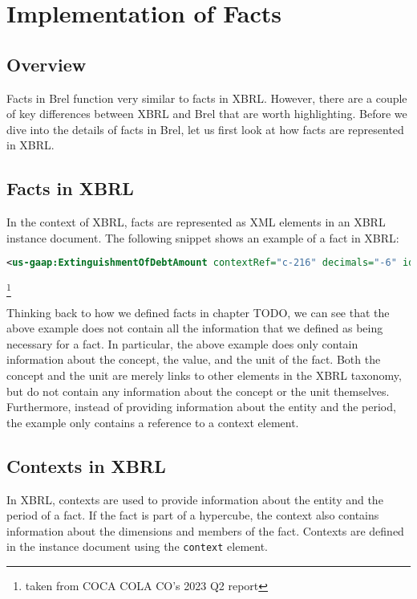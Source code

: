 \section{Implementation of Facts}

\subsection{Overview}

Facts in Brel function very similar to facts in XBRL. 
However, there are a couple of key differences between XBRL and Brel that are worth highlighting.
Before we dive into the details of facts in Brel, let us first look at how facts are represented in XBRL.

\subsection{Facts in XBRL}

In the context of XBRL, facts are represented as XML elements in an XBRL instance document. 
The following snippet shows an example of a fact in XBRL:

\begin{lstlisting}[language=XML]
    <us-gaap:ExtinguishmentOfDebtAmount contextRef="c-216" decimals="-6" id="f-727" unitRef="usd">121000000</us-gaap:ExtinguishmentOfDebtAmount>
\end{lstlisting}\footnote[1]{taken from COCA COLA CO's 2023 Q2 report}

Thinking back to how we defined facts in chapter TODO,
we can see that the above example does not contain all the information that we defined as being necessary for a fact.
In particular, the above example does only contain information about the concept, the value, and the unit of the fact.
Both the concept and the unit are merely links to other elements in the XBRL taxonomy, but do not contain any information about the concept or the unit themselves.
Furthermore, instead of providing information about the entity and the period, the example only contains a reference to a context element. 

\subsection{Contexts in XBRL}

In XBRL, contexts are used to provide information about the entity and the period of a fact. 
If the fact is part of a hypercube, the context also contains information about the dimensions and members of the fact.
Contexts are defined in the instance document using the \texttt{context} element.

